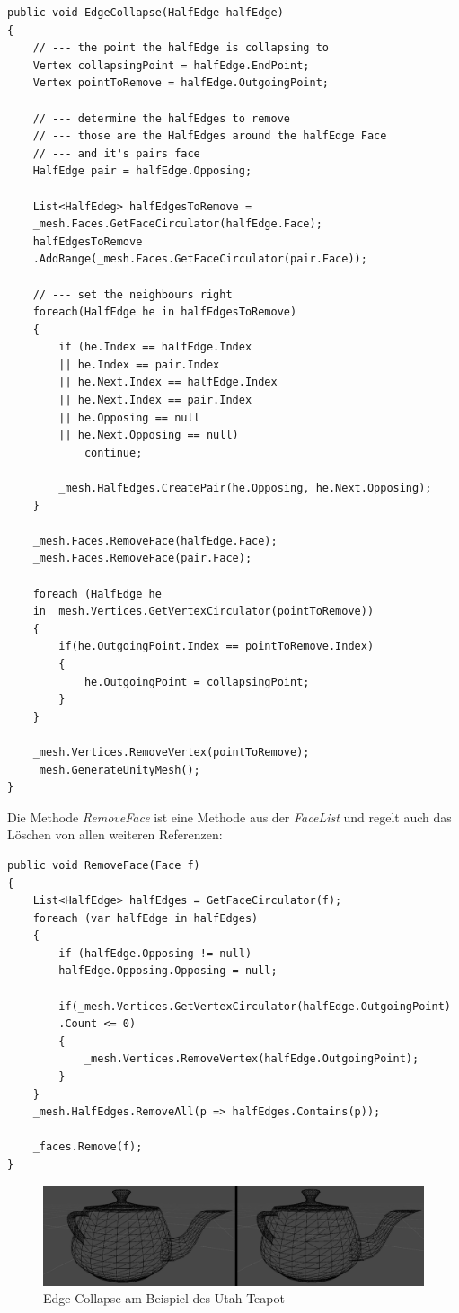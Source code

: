 \begin{lstlisting}
public void EdgeCollapse(HalfEdge halfEdge)
{
	// --- the point the halfEdge is collapsing to
	Vertex collapsingPoint = halfEdge.EndPoint;
	Vertex pointToRemove = halfEdge.OutgoingPoint;

	// --- determine the halfEdges to remove
	// --- those are the HalfEdges around the halfEdge Face 
	// --- and it's pairs face
	HalfEdge pair = halfEdge.Opposing;

	List<HalfEdeg> halfEdgesToRemove =
	_mesh.Faces.GetFaceCirculator(halfEdge.Face);
	halfEdgesToRemove
	.AddRange(_mesh.Faces.GetFaceCirculator(pair.Face));

	// --- set the neighbours right
	foreach(HalfEdge he in halfEdgesToRemove)
	{
		if (he.Index == halfEdge.Index 
		|| he.Index == pair.Index 
		|| he.Next.Index == halfEdge.Index 
		|| he.Next.Index == pair.Index
		|| he.Opposing == null 
		|| he.Next.Opposing == null)
			continue;

		_mesh.HalfEdges.CreatePair(he.Opposing, he.Next.Opposing);
	}

	_mesh.Faces.RemoveFace(halfEdge.Face);
	_mesh.Faces.RemoveFace(pair.Face);

	foreach (HalfEdge he 
	in _mesh.Vertices.GetVertexCirculator(pointToRemove))
	{
		if(he.OutgoingPoint.Index == pointToRemove.Index)
		{
			he.OutgoingPoint = collapsingPoint;
		}
	}

	_mesh.Vertices.RemoveVertex(pointToRemove);
	_mesh.GenerateUnityMesh();
}
\end{lstlisting}
Die Methode \textit{RemoveFace} ist eine Methode aus der \textit{FaceList} und regelt auch das L\"oschen von allen weiteren Referenzen:
\begin{lstlisting}
public void RemoveFace(Face f)
{
	List<HalfEdge> halfEdges = GetFaceCirculator(f);
	foreach (var halfEdge in halfEdges)
	{
		if (halfEdge.Opposing != null)
		halfEdge.Opposing.Opposing = null;

		if(_mesh.Vertices.GetVertexCirculator(halfEdge.OutgoingPoint)
		.Count <= 0)
		{
			_mesh.Vertices.RemoveVertex(halfEdge.OutgoingPoint);
		}
	}
	_mesh.HalfEdges.RemoveAll(p => halfEdges.Contains(p));

	_faces.Remove(f);
}
\end{lstlisting}
\begin{figure}[H]
	\centering
	\includegraphics[width=0.9\linewidth]{Images/EdgeCollapseDemo}
	\caption{Edge-Collapse am Beispiel des Utah-Teapot}
	\label{fig:edgecollapsedemo}
\end{figure}


